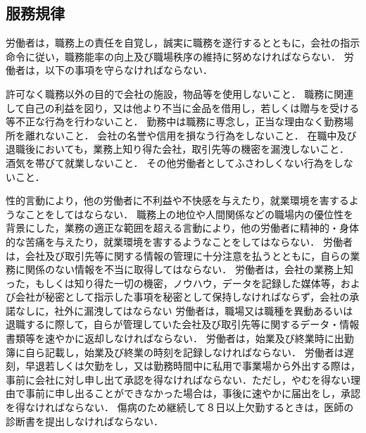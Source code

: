 \documentclass[11pt,a4paper]{jsarticle}
\begin{document}
\subsection{服務規律}
労働者は，職務上の責任を自覚し，誠実に職務を遂行するとともに，会社の指示命令に従い，職務能率の向上及び職場秩序の維持に努めなければならない．
労働者は，以下の事項を守らなければならない．\label{para:obey}
\begin{enumerate}
	\itm	許可なく職務以外の目的で会社の施設，物品等を使用しないこと．
	\itm	職務に関連して自己の利益を図り，又は他より不当に金品を借用し，若しくは贈与を受ける等不正な行為を行わないこと．
	\itm	勤務中は職務に専念し，正当な理由なく勤務場所を離れないこと．
	\itm	会社の名誉や信用を損なう行為をしないこと．
	\itm	在職中及び退職後においても，業務上知り得た会社，取引先等の機密を漏洩しないこと．
	\itm	酒気を帯びて就業しないこと．
	\itm	その他労働者としてふさわしくない行為をしないこと．
\end{enumerate}
性的言動により，他の労働者に不利益や不快感を与えたり，就業環境を害するようなことをしてはならない．
\label{para:sexsualharrassment}
職務上の地位や人間関係などの職場内の優位性を背景にした，業務の適正な範囲を超える言動により，他の労働者に精神的・身体的な苦痛を与えたり，就業環境を害するようなことをしてはならない．
\label{para:powerharrassment}
労働者は，会社及び取引先等に関する情報の管理に十分注意を払うとともに，自らの業務に関係のない情報を不当に取得してはならない．
\label{para:confidentiality}
\term
労働者は，会社の業務上知った，もしくは知り得た一切の機密，ノウハウ，データを記録した媒体等，および会社が秘密として指示した事項を秘密として保持しなければならず，会社の承諾なしに，社外に漏洩してはならない
\term
労働者は，職場又は職種を異動あるいは退職するに際して，自らが管理していた会社及び取引先等に関するデータ・情報書類等を速やかに返却しなければならない．
労働者は，始業及び終業時に出勤簿に自ら記載し，始業及び終業の時刻を記録しなければならない．
労働者は遅刻，早退若しくは欠勤をし，又は勤務時間中に私用で事業場から外出する際は，事前に会社に対し申し出て承認を得なければならない．ただし，やむを得ない理由で事前に申し出ることができなかった場合は，事後に速やかに届出をし，承認を得なければならない．
\term
傷病のため継続して８日以上欠勤するときは，医師の診断書を提出しなければならない．
\end{document}

